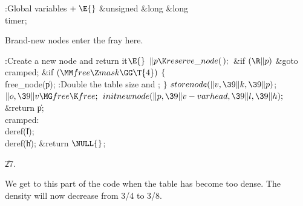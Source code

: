\B{}:Global variables\X${}\mathrel+\E{}$\6
\&{unsigned} \&{long} \&{long} \\{timer};\par
\fi

Brand-new nodes enter the fray here.

\Y\B\4:Create a new node and return it\X${}\E{}$\6
$\|p\K\\{reserve\_node}(\,);{}$\6
\&{if} ${}(\R\|p){}$\1\5
\&{goto} \\{cramped};\2\6
\&{if} ${}(\MM\\{free}\Z\\{mask}\GG\T{4}){}$\5
${}\{{}$\1\6
\\{free\_node}(\|p);\6
:Double the table size and \X;\6
\4${}\}{}$\2\6
${}\\{storenode}(\|v,\39\|k,\39\|p){}$;\5
${}\|o,\39\|v\MG\\{free}\K\\{free};{}$\6
${}\\{initnewnode}(\|p,\39\|v-\\{varhead},\39\|l,\39\|h);{}$\6
\&{return} \|p;\6
\4\\{cramped}:\6
\\{deref}(\|l);\6
\\{deref}(\|h);\6
\&{return} ${}\NULL{}$;\par
\U27.\fi

We get to this part of the code when the table has become too dense.
The density will now decrease from 3/4 to 3/8.

